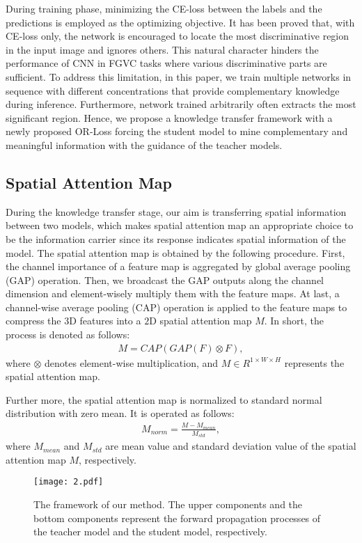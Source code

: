 \documentclass{article}
\begin{document}
During training phase, minimizing the CE-loss between the labels and the predictions is employed as the optimizing objective. It has been proved that, with CE-loss only, the network is encouraged to locate the most discriminative region in the input image \cite{ge2019weakly} and ignores others. This natural character hinders the performance of CNN in FGVC tasks where various discriminative parts are sufficient. To address this limitation, in this paper, we train multiple networks in sequence with different concentrations that provide complementary knowledge during inference. Furthermore, network trained arbitrarily often extracts the most significant region. Hence, we propose a knowledge transfer framework with a newly proposed OR-Loss forcing the student model to mine complementary and meaningful information with the guidance of the teacher models.
\subsection{Spatial Attention Map}

During the knowledge transfer stage, our aim is transferring spatial information between two models, which makes spatial attention map an appropriate choice to be the information carrier since its response indicates spatial information of the model. The spatial attention map is obtained by the following procedure. First, the channel importance of a feature map is aggregated by global average pooling (GAP) operation. Then, we broadcast the GAP outputs along the channel dimension and element-wisely multiply them with the feature maps. At last, a channel-wise average pooling (CAP) operation is applied to the feature maps to compress the $3$D features into a $2$D spatial attention map $M$. In short, the process is denoted as follows:
\begin{align}
M=CAP(GAP(F) \otimes F),
\end{align}
where $\otimes$ denotes element-wise multiplication, and $M\in R^{1\times W\times H}$ represents the spatial attention map. 

Further more, the spatial attention map is normalized to standard normal distribution with zero mean. It is operated as follows:
\begin{align}
M_{norm}=\frac{M-M_{mean}}{M_{std}},
\end{align}
where $M_{mean}$ and $M_{std}$ are mean value and standard deviation value of the spatial attention map $M$, respectively. 

\begin{figure}[!t]
\centering
\texttt{[image: 2.pdf]}
\caption{The framework of our method. The upper components and the bottom components represent the forward propagation processes of the teacher model and the student model, respectively.}
\label{fig:photo2}
\end{figure}
\end{document}
